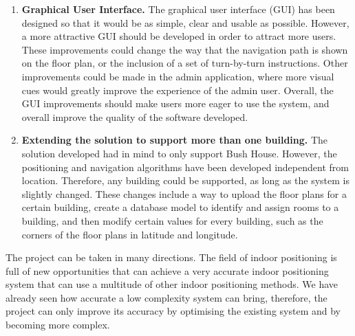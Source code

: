 \begin{enumerate}
    \item \textbf{Graphical User Interface.}\newline
    The graphical user interface (GUI) has been designed so that it would be as simple, clear and usable as possible. However, a more attractive GUI should be developed in order to attract more users. These improvements could change the way that the navigation path is shown on the floor plan, or the inclusion of a set of turn-by-turn instructions. Other improvements could be made in the admin application, where more visual cues would greatly improve the experience of the admin user. Overall, the GUI improvements should make users more eager to use the system, and overall improve the quality of the software developed.
    
    \item \textbf{Extending the solution to support more than one building.}\newline
    The solution developed had in mind to only support Bush House. However, the positioning and navigation algorithms have been developed independent from location. Therefore, any building could be supported, as long as the system is slightly changed. These changes include a way to upload the floor plans for a certain building, create a database model to identify and assign rooms to a building, and then modify certain values for every building, such as the corners of the floor plans in latitude and longitude.
\end{enumerate}
\newline

The project can be taken in many directions. The field of indoor positioning is full of new opportunities that can achieve a very accurate indoor positioning system that can use a multitude of other indoor positioning methods. We have already seen how accurate a low complexity system can bring, therefore, the project can only improve its accuracy by optimising the existing system and by becoming more complex.